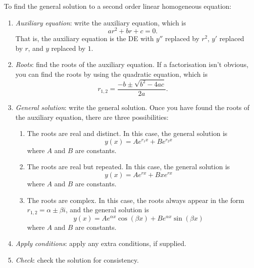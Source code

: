 \documentclass{book}
\begin{document}
To find the general solution to a second order linear homogeneous equation:
\begin{enumerate}
\item \emph{Auxiliary equation}: write the auxiliary equation, which
  is
  \begin{equation*}
    a r^2 + b r + c = 0.
  \end{equation*}
  That is, the auxiliary equation is the DE with $y''$ replaced by
  $r^2$, $y'$ replaced by $r$, and $y$ replaced by $1$.
\item \emph{Roots}: find the roots of the auxiliary equation.  If a
  factorisation isn't obvious, you can find the roots by using the
  quadratic equation, which is
  \begin{equation*}
    r_{1,2} = \frac{-b \pm \sqrt{b^2 - 4ac}}{2a}.
  \end{equation*}
\item \emph{General solution}: write the general solution.  Once you
  have found the roots of the auxiliary equation, there are three
  possibilities:
  \begin{enumerate}
  \item The roots are real and distinct.  In this case, the general
    solution is
    \begin{equation*}
      y(x) = A e^{r_1 x} + B e^{r_2 x}
    \end{equation*}
    where $A$ and $B$ are constants.
  \item The roots are real but repeated.  In this case, the general
    solution is
    \begin{equation*}
      y(x) = A e^{r x} + B x e^{r x}
    \end{equation*}
    where $A$ and $B$ are constants.
  \item The roots are complex.  In this case, the roots always appear
    in the form $r_{1,2} = \alpha \pm \beta i$, and the general
    solution is
    \begin{equation*}
      y(x) = A e^{\alpha x} \cos(\beta x) + B e^{\alpha x} \sin(\beta x)
    \end{equation*}
    where $A$ and $B$ are constants.
  \end{enumerate}
\item \emph{Apply conditions}: apply any extra conditions, if
  supplied.
\item \emph{Check}: check the solution for consistency.
\end{enumerate}

\end{document}
